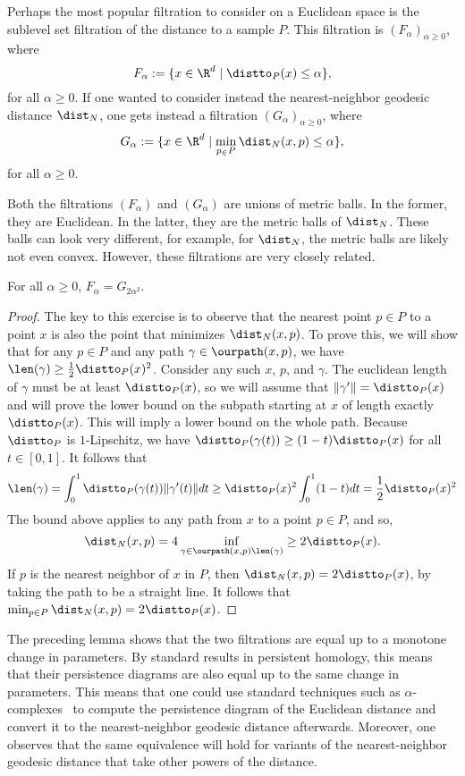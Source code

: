     Perhaps the most popular filtration to consider on a Euclidean space is the sublevel set filtration of the distance to a sample $P$.
    This filtration is $(F_\alpha)_{\alpha\ge 0}$, where
    \[
      F_\alpha := \{x\in \R^d \mid \distto_P(x) \le \alpha\},
    \]
    for all $\alpha \ge 0$.
    If one wanted to consider instead the nearest-neighbor geodesic distance $\dist_N$, one gets instead a filtration $(G_\alpha)_{\alpha\ge 0}$, where
    \[
      G_\alpha := \{x\in \R^d \mid \min_{p_\in P} \dist_N(x,p) \le \alpha\},
    \]
    for all $\alpha \ge 0$.

    Both the filtrations $(F_\alpha)$ and $(G_\alpha)$ are unions of metric balls.
    In the former, they are Euclidean.
    In the latter, they are the metric balls of $\dist_N$.
    These balls can look very different, for example, for $\dist_N$, the metric balls are likely not even convex.
    However, these filtrations are very closely related.
    \begin{lemma}
      For all $\alpha \ge 0$, $F_\alpha = G_{2\alpha^2}$.
    \end{lemma}
    \begin{proof}
      The key to this exercise is to observe that the nearest point $p \in P$ to a point $x$ is also the point that minimizes $\dist_N(x,p)$.
      To prove this, we will show that for any $p\in P$ and any path $\gamma\in \ourpath(x,p)$, we have $\len(\gamma)\ge \frac{1}{2}\distto_P(x)^2$.
      Consider any such $x$, $p$, and $\gamma$.
      The euclidean length of $\gamma$ must be at least $\distto_P(x)$, so we will assume that $\|\gamma'\| = \distto_P(x)$ and will prove the lower bound on the subpath starting at $x$ of length exactly $\distto_P(x)$.
      This will imply a lower bound on the whole path.
      Because $\distto_P$ is $1$-Lipschitz, we have $\distto_P(\gamma(t))\ge (1-t)\distto_P(x)$ for all $t\in [0,1]$.  It follows that
      \[
        \len(\gamma) = \int_0^1 \distto_P(\gamma(t))\|\gamma'(t)\|dt
          \ge \distto_P(x)^2 \int_0^1 (1-t)dt
          =  \frac{1}{2}\distto_P(x)^2
      \]
      The bound above applies to any path from $x$ to a point $p\in P$, and so,
      \[
        \dist_N(x,p) = 4 \inf_{\gamma\in \ourpath(x,p) \len(\gamma)} \ge 2\distto_P(x).
      \]
      If $p$ is the nearest neighbor of $x$ in $P$, then $\dist_N(x,p) = 2\distto_P(x)$, by taking the path to be a straight line.
      It follows that $\min_{p\in P}\dist_N(x,p) = 2\distto_P(x)$.
    \end{proof}

    The preceding lemma shows that the two filtrations are equal up to a monotone change in parameters.
    By standard results in persistent homology, this means that their persistence diagrams are also equal up to the same change in parameters.
    This means that one could use standard techniques such as $\alpha$-complexes~\cite{edelsbrunner02topological} to compute the persistence diagram of the Euclidean distance and convert it to the nearest-neighbor geodesic distance afterwards.
    Moreover, one observes that the same equivalence will hold for variants of the nearest-neighbor geodesic distance that take other powers of the distance.

